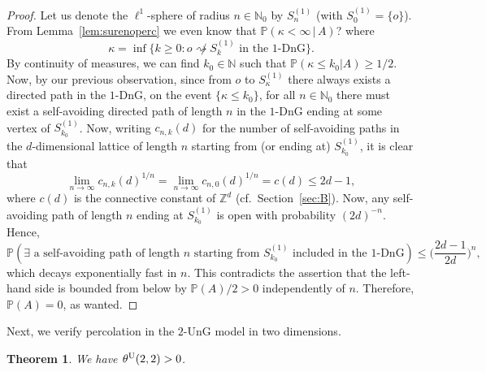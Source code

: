\documentclass{article}
\newcommand{\N}{\mathbb{N}}
\newtheorem{theorem}{Theorem}[section]
\theoremstyle{definition}
\renewcommand{\P}{\mathbb{P}}
\newcommand{\1}{\mathbbm{1}}
\newcommand{\0}{\mathbf{o}}
\newcommand{\Z}{\mathbb{Z}}
\begin{document}
\begin{proof}
Let us denote the $\ell^1$-sphere of radius $n\in\N_0$ by $S^{(1)}_n$ (with $S^{(1)}_0=\{o\}$). From Lemma~\ref{lem:surenoperc} we even know that $\P(\kappa<\infty\,|\,A)$? where
\[ \kappa = \inf \big\{ k \geq 0 \colon o \not\rightsquigarrow S^{(1)}_k \text{ in the $1$-DnG} \big\}. \]
By continuity of measures, we can find $k_0\in\N$ such that $\P(\kappa \leq k_0 |A) \geq 1/2$. Now, by our previous observation, since from $o$ to $S^{(1)}_\kappa$ there always exists a directed path in the $1$-DnG, 
on the event $\{ \kappa \leq k_0 \}$, for all $n\in\N_0$ there must exist a self-avoiding directed path of length $n$ in the $1$-DnG ending at some vertex of $S^{(1)}_{k_0}$. Now, writing $c_{n,k}(d)$ for the number of self-avoiding paths in the $d$-dimensional lattice of length $n$ starting from (or ending at) $S^{(1)}_{k_0}$, it is clear that
\[ \lim_{n\to\infty} c_{n,k}(d)^{1/n} = \lim_{n\to\infty} c_{n,0}(d)^{1/n}=c(d) \leq 2d-1, \]
where $c(d)$ is the connective constant of $\Z^d$ (cf.\ Section~\ref{sec:B}). Now, any self-avoiding path of length $n$ ending at $S^{(1)}_{k_0}$ is open with probability $(2d)^{-n}$. Hence,
\[ \P(\exists\text{ a self-avoiding path of length $n$ starting from $S^{(1)}_{k_0}$ included in the $1$-DnG}) \leq \Big( \frac{2d-1}{2d} \Big)^n, \]
which decays exponentially fast in $n$. This contradicts the assertion that the left-hand side is bounded from below by $\P(A)/2>0$ independently of $n$. Therefore, $\P(A)=0$, as wanted.
\end{proof}

Next, we verify percolation in the $2$-UnG model in two dimensions.

\begin{theorem}\label{theorem-U22}
  We have $\theta^{\rm U}(2,2)>0$. 
\end{theorem}
\end{document}
